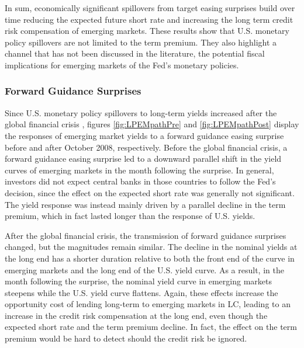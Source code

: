 {%
In sum, economically significant spillovers from target easing surprises build over time reducing the expected future short rate and increasing the long term credit risk compensation of emerging markets.
These results show that U.S. monetary policy spillovers 
are not limited to the term premium.
They also highlight a channel that has not been discussed in the literature, the potential fiscal implications for emerging markets of the Fed's monetary policies. 


\subsubsection{Forward Guidance Surprises}
\iftoggle{toclinks}{\gototoc}{} %

Since U.S. monetary policy spillovers to long-term yields increased after the global financial crisis \citep{Albaglietal:2019}, figures \ref{fig:LPEMpathPre} and \ref{fig:LPEMpathPost} display the responses of emerging market yields to a forward guidance easing surprise before and after October 2008, respectively.
Before the global financial crisis, a forward guidance easing surprise led to a downward parallel shift in the yield curves of emerging markets in the month following the surprise.
In general, investors did not expect central banks in those countries to follow the Fed's decision, since the effect on the expected short rate was generally not significant. 
The yield response was instead mainly driven by a parallel decline in the term premium, which in fact lasted longer than the response of U.S. yields.

After the global financial crisis, the transmission of forward guidance surprises changed, but %
the magnitudes remain similar.
The decline in the nominal yields at the long end has a shorter duration relative to both 
the front end of the curve in emerging markets and the long end of the U.S. yield curve. 
As a result, in the month following the surprise, 
the nominal yield curve in emerging markets steepens while the U.S. yield curve flattens. 
Again, these effects increase the opportunity cost of lending long-term to emerging markets in LC, leading to an increase in the credit risk compensation at the long end, even though the expected short rate and the term premium decline. In fact, the effect on the term premium would be hard to detect should the credit risk be ignored.

}
